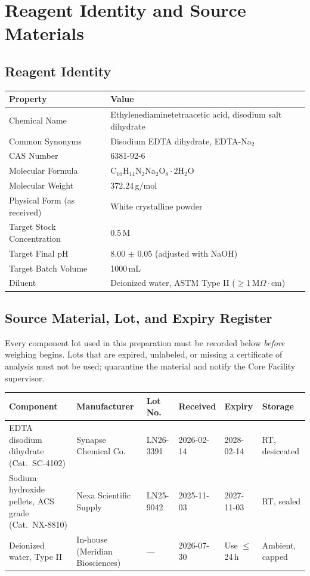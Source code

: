 \section{Reagent Identity and Source Materials}
\label{sec:reagentspec}

\subsection{Reagent Identity}

\begin{tabularx}{\textwidth}{@{}lX@{}}
\toprule
\textbf{Property} & \textbf{Value} \\
\midrule
Chemical Name & Ethylenediaminetetraacetic acid, disodium salt dihydrate \\
\rowcolor{labteal!5}
Common Synonyms & Disodium EDTA dihydrate, EDTA-Na$_2$ \\
CAS Number & 6381-92-6 \\
\rowcolor{labteal!5}
Molecular Formula & C$_{10}$H$_{14}$N$_2$Na$_2$O$_8 \cdot 2$H$_2$O \\
Molecular Weight & 372.24\,g/mol \\
\rowcolor{labteal!5}
Physical Form (as received) & White crystalline powder \\
Target Stock Concentration & 0.5\,M \\
\rowcolor{labteal!5}
Target Final pH & 8.00 $\pm$ 0.05 (adjusted with NaOH) \\
Target Batch Volume & 1000\,mL \\
\rowcolor{labteal!5}
Diluent & Deionized water, ASTM Type II ($\geq$1\,M$\Omega\cdot$cm) \\
\bottomrule
\end{tabularx}

\subsection{Source Material, Lot, and Expiry Register}

Every component lot used in this preparation must be recorded below \emph{before} weighing
begins. Lots that are expired, unlabeled, or missing a certificate of analysis must not be
used; quarantine the material and notify the Core Facility supervisor.

\begin{tabularx}{\textwidth}{@{}p{4.0cm}p{2.7cm}p{1.7cm}p{1.7cm}p{1.7cm}X@{}}
\toprule
\textbf{Component} & \textbf{Manufacturer} & \textbf{Lot No.} & \textbf{Received} & \textbf{Expiry} & \textbf{Storage} \\
\midrule
EDTA disodium dihydrate (Cat.\ SC-4102) & Synapse Chemical Co. & LN26-3391 & 2026-02-14 & 2028-02-14 & RT, desiccated \\
\rowcolor{labteal!5}
Sodium hydroxide pellets, ACS grade (Cat.\ NX-8810) & Nexa Scientific Supply & LN25-9042 & 2025-11-03 & 2027-11-03 & RT, sealed \\
Deionized water, Type II & In-house (Meridian Biosciences) & --- & 2026-07-30 & Use $\le$24\,h & Ambient, capped \\
\bottomrule
\end{tabularx}

